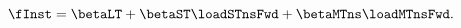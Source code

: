 \begin{equation} \label{eq:nNSfwd}
	\fInst = \betaLT + \betaST \loadSTnsFwd + \betaMTns \loadMTnsFwd.
\end{equation}